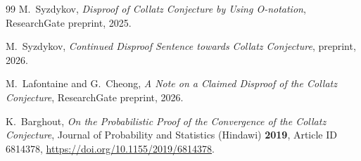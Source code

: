 \documentclass[11pt]{article}
\begin{document}
\begin{thebibliography}{99}
 M.\ Syzdykov, \emph{Disproof of Collatz
  Conjecture by Using O-notation}, ResearchGate preprint, 2025.

 M.\ Syzdykov, \emph{Continued Disproof Sentence
  towards Collatz Conjecture}, preprint, 2026.

 M.\ Lafontaine and G.\ Cheong, \emph{A
  Note on a Claimed Disproof of the Collatz Conjecture}, ResearchGate
  preprint, 2026.

 K.\ Barghout, \emph{On the Probabilistic Proof
  of the Convergence of the Collatz Conjecture}, Journal of Probability
  and Statistics (Hindawi) \textbf{2019}, Article ID 6814378,
  \url{https://doi.org/10.1155/2019/6814378}.

\end{thebibliography}
\end{document}
